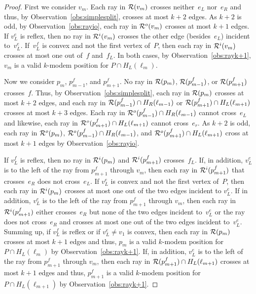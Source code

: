 \documentclass[A4]{article}
\begin{document}
\begin{proof}
First we consider $v_m$.
Each ray in ${\cal R}(v_m)$ crosses neither~$e_L$ nor~$e_R$ and thus, by Observation~\ref{obs:simplesplit}, crosses at most $k+2$ edges.
As $k+2$ is odd, by Observation~\ref{obs:rayio}, each ray in ${\cal R}^o(v_m)$ crosses at most $k+1$ edges.
If $v^e_L$ is reflex, then no ray in ${\cal R}^i(v_m)$ crosses the other edge (besides~$e_L$) incident to~$v^e_L$.
If~$v^f_L$ is convex and not the first vertex of~$P$, then each ray in ${\cal R}^i(v_m)$ crosses at most one out of~$f$ and~$f_L$.
In both cases, by Observation~\ref{obs:rayk+1}, $v_m$ is a valid \mbox{$k$-modem} position for $P\cap H_L(\ell_{m})$.



Now we consider $p_m$, $p^f_{m-1}$, and $p^f_{m+1}$.
No ray in ${\cal R}(p_m)$, ${\cal R}(p^f_{m-1})$, or ${\cal R}(p^f_{m+1})$ crosses~$f$.
Thus, by Observation~\ref{obs:simplesplit}, each ray in ${\cal R}(p_m)$ crosses at most $k+2$ edges, and each ray in ${\cal R}(p^f_{m-1})\cap H_R(\ell_{m-1})$ or ${\cal R}(p^f_{m+1})\cap H_L(\ell_{m+1})$ crosses at most $k+3$ edges.
Each ray in ${\cal R}^o(p^f_{m-1})\cap H_R(\ell_{m-1})$ cannot cross~$e_L$ and likewise, each ray in ${\cal R}^o(p^f_{m+1})\cap H_L(\ell_{m+1})$ cannot cross~$e_r$.
As $k+2$ is odd, each ray in ${\cal R}^o(p_m)$, ${\cal R}^o(p^f_{m-1})\cap H_R(\ell_{m-1})$, and ${\cal R}^o(p^f_{m+1})\cap H_L(\ell_{m+1})$ cross at most $k+1$ edges by Observation~\ref{obs:rayio}.



If $v^f_L$ is reflex, then no ray in ${\cal R}^i(p_m)$ and ${\cal R}^i(p^f_{m+1})$ crosses~$f_L$.
If, in addition, $v^e_L$ is to the left of the ray from $p^f_{m+1}$ through $v_m$, then each ray in ${\cal R}^i(p^f_{m+1})$ that crosses~$e_R$ does not cross~$e_L$.
If $v^e_L$ is convex and not the first vertex of~$P$, then each ray in ${\cal R}^i(p_m)$ crosses at most one out of the two edges incident to $v^e_L$.
If in addition, $v^e_L$ is to the left of the ray from $p^f_{m+1}$ through $v_m$, then each ray in ${\cal R}^i(p^f_{m+1})$ either crosses~$e_R$ but none of the two edges incident to~$v^e_L$ or the ray does not cross~$e_R$ and crosses at most one out of the two edges incident to~$v^e_L$.
Summing up, if $v^f_L$ is reflex or if $v^e_L\neq v_1$ is convex, then each ray in ${\cal R}(p_{m})$ crosses at most $k+1$ edges and thus, $p_m$ is a valid \mbox{$k$-modem} position for $P\cap H_L(\ell_{m})$ by Observation~\ref{obs:rayk+1}.
If, in addition, $v^e_L$ is to the left of the ray from $p^f_{m+1}$ through $v_m$, then each ray in ${\cal R}(p^f_{m+1})\cap H_L(\ell_{m+1})$ crosses at most $k+1$ edges and thus, $p^f_{m+1}$ is a valid \mbox{$k$-modem} position for $P\cap H_L(\ell_{m+1})$ by Observation~\ref{obs:rayk+1}.




\end{proof}
\end{document}
